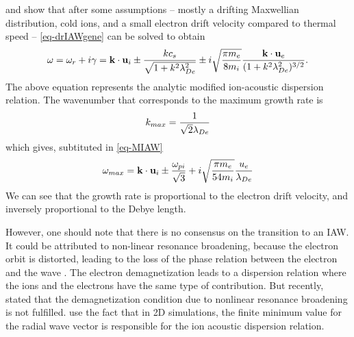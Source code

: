    \citet{lafleur2016} and \citet{janhunen2018} show that after some assumptions -- mostly a drifting Maxwellian distribution, cold ions, and a small electron drift velocity compared to thermal speed -- \cref{eq-drIAWgene} can be solved to obtain
    \begin{equation} \label{eq-MIAW}
      \omega = \omega_r + i \gamma = {\mathbf k} \cdot {\mathbf u_{i}} \pm \frac{k c_s}{\sqrt{1 + k^2 \lambda_{De}^2}} \pm i \sqrt{\frac{\pi m_e}{8 m_i}} \frac{{\mathbf k} \cdot {\mathbf u_{e}}}{( 1 + k^2 \lambda_{De}^2)^{3/2}}.
    \end{equation}
    The above equation represents the analytic modified ion-acoustic dispersion relation.
    The wavenumber that corresponds to the maximum growth rate is \citep{lafleur2016}
    \begin{equation} \label{eq-mostk}
      k_{max} = \frac{1}{\sqrt{2} \lambda_{De}}
    \end{equation}
    which gives, subtituted in \cref{eq-MIAW}
    \begin{equation} \label{eq-mostw}
      \omega_{max} =  {\mathbf k} \cdot {\mathbf u_{i}} \pm \frac{\omega_{pi}}{\sqrt{3}} + i \sqrt{ \frac{\pi m_e}{54 m_i}}\frac{u_e}{\lambda_{De}}
    \end{equation}
    We can see that the growth rate is proportional to the electron drift velocity, and inversely proportional to the Debye length.
    
    However, one should note that there is no consensus on the transition to an \ac{IAW}.
    It could be attributed to non-linear resonance broadening, because the electron orbit is distorted, leading to the loss of the phase relation between the electron and the wave \citep{taccogna2019}.
    The electron demagnetization leads to a dispersion relation where the ions and the electrons have the same type of contribution.
    But recently, \citet{janhunen2018a} stated that the demagnetization condition due to nonlinear resonance broadening is not fulfilled.
    \citet{lafleur2017a} use the fact that in \ac{2D} simulations, the finite minimum value for the radial wave vector is responsible for the ion acoustic dispersion relation.
    
    